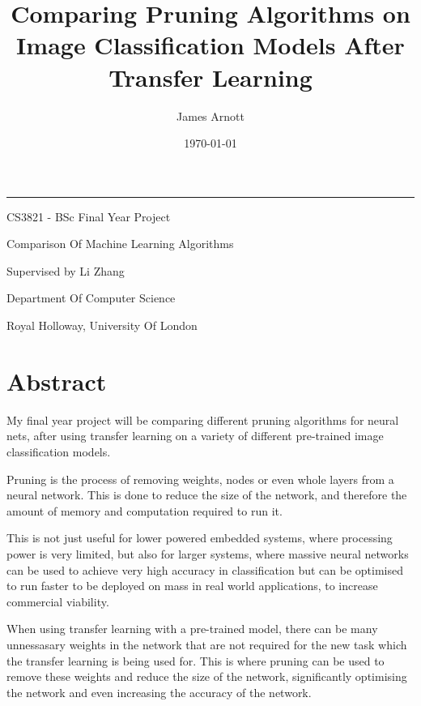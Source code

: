 \documentclass{article}
\title{\titleFont Comparing Pruning Algorithms on Image Classification Models After Transfer Learning}
\date{\Large \today}
\author{\subtitleFont James Arnott}
\begin{document}
\maketitle

\begin {center}
\noindent\rule{15cm}{0.4pt}
\end{center}

\vspace{1cm}

\begin{center}
	\begin{Large}
			CS3821 - BSc Final Year Project
			
			Comparison Of Machine Learning Algorithms

			Supervised by Li Zhang

			\vspace{0.6cm}

			Department Of Computer Science

			\vspace{0.2cm}

			Royal Holloway, University Of London
	\end{Large}
\end{center}


\pagebreak

\section{Abstract}
My final year project will be comparing different pruning algorithms for neural nets,
after using transfer learning on a variety of different pre-trained image classification models.

Pruning is the process of removing weights, nodes or even whole layers from a neural network.
This is done to reduce the size of the network, and therefore the amount of memory and
computation required to run it.

This is not just useful for lower powered embedded systems\cite{EmbeddedSystems},
where processing power is very limited, but also for larger systems,
where massive neural networks can be used to achieve very
high accuracy in classification but can be optimised to run faster
to be deployed on mass in real world applications, to increase
commercial viability.

When using transfer learning with a pre-trained model, there can be many
unnessasary weights in the network that are not required for the new task
which the transfer learning is being used for. This is where pruning can be used
to remove these weights and reduce the size of the network, significantly
optimising the network and even increasing the accuracy of the network.
\end{document}
